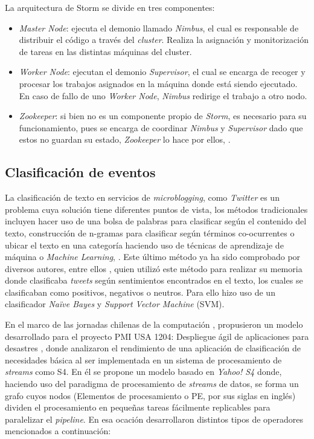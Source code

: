 La arquitectura de Storm se divide en tres componentes:

\begin{itemize}
\item \textit{Master Node}: ejecuta el demonio llamado \textit{Nimbus}, el cual es responsable de distribuir el código a través del \textit{cluster}. Realiza la asignación y monitorización de tareas en las distintas máquinas del cluster.
\item \textit{Worker Node}: ejecutan el demonio \textit{Supervisor}, el cual se encarga de recoger y procesar los trabajos asignados en la máquina donde está siendo ejecutado. En caso de fallo de uno \textit{Worker Node}, \textit{Nimbus} redirige el trabajo a otro nodo.
\item \textit{Zookeeper}: si bien no es un componente propio de \textit{Storm}, es necesario para su funcionamiento, pues se encarga de coordinar \textit{Nimbus} y \textit{Supervisor} dado que estos no guardan su estado, \textit{Zookeeper} lo hace por ellos, \cite{StormState}.
\end{itemize}	

\subsection{Clasificación de eventos}
\label{intro:ea:clasificacion}

La clasificación de texto en servicios de \textit{microblogging}, como \textit{Twitter} es un problema cuya solución tiene diferentes puntos de vista, los métodos tradicionales incluyen hacer uso de una bolsa de palabras para clasificar según el contenido del texto, construcción de n-gramas para clasificar según términos co-ocurrentes o ubicar el texto en una categoría haciendo uso de técnicas de aprendizaje de máquina o \textit{Machine Learning}, \cite{EventDetection}. 
Este último método ya ha sido comprobado por diversos autores, entre ellos \cite{Maldonado}, quien utilizó este método para realizar su memoria donde clasificaba \textit{tweets} según sentimientos encontrados en el texto, los cuales se clasificaban como positivos, negativos o neutros. Para ello hizo uso de un clasificador \textit{Naïve Bayes} y \textit{Support Vector Machine} (SVM). 

En el marco de las jornadas chilenas de la computación \cite{WladdimiroPMI}, propusieron un modelo desarrollado para el proyecto PMI USA 1204: Despliegue ágil de aplicaciones para desastres \cite{PMIProfes}, donde analizaron el rendimiento de una aplicación de clasificación de necesidades básica al ser implementada en un sistema de procesamiento de \textit{streams} como S4. En él se propone un modelo basado en \textit{Yahoo! S4} donde, haciendo uso del paradigma de procesamiento de \textit{streams} de datos, se forma un grafo cuyos nodos (Elementos de procesamiento o PE, por sus siglas en inglés) dividen el procesamiento en pequeñas tareas fácilmente replicables para paralelizar el \textit{pipeline}. En esa ocación desarrollaron distintos tipos de operadores mencionados a continuación:

